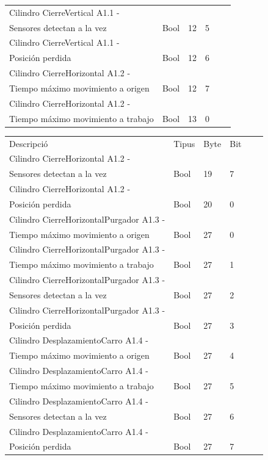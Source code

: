\documentclass{tfgitic}[2022/06/30]
\begin{document}
\begin{table}[h]
\begin{tabular}{
>{\columncolor[HTML]{EBEAEA}}llllll}
Cilindro CierreVertical A1.1 -\\Sensores detectan a la vez& Bool & 12 & 5 \\
Cilindro CierreVertical A1.1 -\\Posición perdida& Bool & 12 & 6 \\
Cilindro CierreHorizontal A1.2 -\\Tiempo máximo movimiento a origen& Bool & 12 & 7 \\
Cilindro CierreHorizontal A1.2 -\\Tiempo máximo movimiento a trabajo& Bool & 13 & 0 \\
\end{tabular}
\end{table}
\begin{table}[h]
\centering
\begin{tabular}{
>{\columncolor[HTML]{EBEAEA}}llllll}
\cellcolor[HTML]{D3D3D3} Descripció & \cellcolor[HTML]{D3D3D3} Tipus & \cellcolor[HTML]{D3D3D3} Byte &  \cellcolor[HTML]{D3D3D3} Bit \\
Cilindro CierreHorizontal A1.2 -\\Sensores detectan a la vez& Bool & 19 & 7 \\
Cilindro CierreHorizontal A1.2 -\\Posición perdida& Bool & 20 & 0 \\
Cilindro CierreHorizontalPurgador A1.3 -\\Tiempo máximo movimiento a origen& Bool & 27 & 0 \\
Cilindro CierreHorizontalPurgador A1.3 -\\Tiempo máximo movimiento a trabajo& Bool & 27 & 1 \\
Cilindro CierreHorizontalPurgador A1.3 -\\Sensores detectan a la vez& Bool & 27 & 2 \\
Cilindro CierreHorizontalPurgador A1.3 -\\Posición perdida& Bool & 27 & 3 \\
Cilindro DesplazamientoCarro A1.4 -\\ Tiempo máximo movimiento a origen& Bool & 27 & 4 \\
Cilindro DesplazamientoCarro A1.4 -\\Tiempo máximo movimiento a trabajo& Bool & 27 & 5 \\
Cilindro DesplazamientoCarro A1.4 -\\Sensores detectan a la vez& Bool & 27 & 6 \\
Cilindro DesplazamientoCarro A1.4 -\\Posición perdida& Bool & 27 & 7 \\

\end{tabular}
\end{table}
\end{document}
